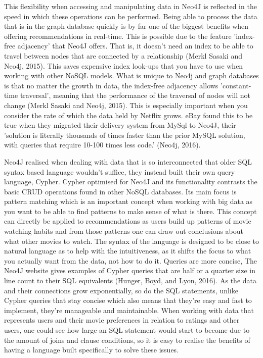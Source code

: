 \documentclass[a4paper]{article}
\begin{document}
This flexibility when accessing and manipulating data in Neo4J is reflected in the speed in which these operations can be performed. Being able to process the data that is in the graph database quickly is by far one of the biggest benefits when offering recommendations in real-time. This is possible due to the feature 'index-free adjacency' that Neo4J offers. That is, it doesn't need an index to be able to travel between nodes that are connected by a relationship (Merkl Sasaki and Neo4j, 2015). This saves expensive index look-ups that you have to use when working with other NoSQL models. What is unique to Neo4j and graph databases is that no matter the growth in data, the index-free adjacency allows 'constant-time traversal', meaning that the performance of the traversal of nodes will not change (Merkl Sasaki and Neo4j, 2015). This is especially important when you consider the rate of which the data held by Netflix grows. eBay found this to be true when they migrated their delivery system from MySql to Neo4J, their 'solution is literally thousands of times faster than the prior MySQL solution, with queries that require 10-100 times less code.' (Neo4j, 2016). \par

Neo4J realised when dealing with data that is so interconnected that older SQL syntax based language wouldn't suffice, they instead built their own query language, Cypher. Cypher optimised for Neo4J and its functionality contrasts the basic CRUD operations found in other NoSQL databases. Its main focus is pattern matching which is an important concept when working with big data as you want to be able to find patterns to make sense of what is there. This concept can directly be applied to recommendations as users build up patterns of movie watching habits and from those patterns one can draw out conclusions about what other movies to watch. The syntax of the language is designed to be close to natural language as to help with the intuitiveness, as it shifts the focus to what you actually want from the data, not how to do it. Queries are more concise, The Neo4J website gives examples of Cypher queries that are half or a quarter size in line count to their SQL equivalents (Hunger, Boyd, and Lyon, 2016). As the data and their connections grow exponentially, so do the SQL statements, unlike Cypher queries that stay concise which also means that they're easy and fast to implement, they're manageable and maintainable. When working with data that represents users and their movie preferences in relation to ratings and other users, one could see how large an SQL statement would start to become due to the amount of joins and clause conditions, so it is easy to realise the benefits of having a language built specifically to solve these issues. \par
\end{document}
